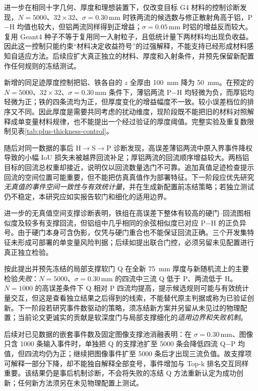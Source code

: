 \documentclass[UTF8,fontset=none,zihao=-4,a4paper]{ctexart}
\begin{document}
进一步在相同十字几何、厚度和理想装置下，仅改变目标 G4 材料的控制诊断发现，$N=5000$、$32\times32$、$\sigma=0.30\,\mathrm{mm}$ 时铁两流的候选数与修正散射角高于铝，P$-$H 均值也较大，但铝两流同样得到正增益；$\sigma=0.05\,\mathrm{mm}$ 时铝的增益反而较大。复用 Geant4 种子不等于复用同一入射粒子，且低统计量下两材料均出现负收益。因此这一控制只能约束“材料决定收益符号”的过强解释，不能支持已经形成材料感知自适应方法。后续应扩大真正独立的材料、厚度和入射条件，并预先保留新配置作任何规则的冻结测试。

新增的同足迹厚度控制把铝、铁各自的 $z$ 全厚由 \SI{100}{mm} 降为 \SI{50}{mm}。在预定的 $N=5000$、$32\times32$、$\sigma=0.30\,\mathrm{mm}$ 条件下，薄铝两流 P$-$H 均轻微为负，而厚铝均轻微为正；铁的四条流均为正，但厚度变化的增益幅度不一致。较小误差档位的排序又不同。因此厚度是需要共同考虑的扰动维度，现阶段既不能把旧的材料对照解释成单变量材料规律，也不能提出一个经过验证的厚度阈值。完整实验及重复数限制见表\ref{tab:plus-thickness-control}。

随后对同一数据的事后 H$\to$S$\to$P 诊断发现，高误差薄铝两流中原入界事件降权导致的小幅 IoU 损失未被越界回流补足；厚铝两流的回流顺序增益较大。两档铝目标的回流总权重却接近，说明仅以回流数量选门不可靠。追加真值足迹检查提示回流的空间位置可能重要，但不能把仿真真值作为部署特征。下一阶段应优先研究\emph{无真值的事件空间一致性与有效统计量}，并在生成新配置前冻结策略；若独立测试仍不稳定，本研究应如实报告软门和细化的适用边界。

进一步的无真值空间支撑诊断表明，铁组在高误差下整体有较高的硬门--回流图相似度及较多有支撑回流，但铝组中几乎相同的余弦相似度已对应 P$-$H 的正负异号。由于硬门本身可含伪影，仅凭与硬门重合也不能保证回流正确。三个开发集特征未形成可部署的单变量风险判据；后续如提出联合门控，必须另留未见配置进行真正独立检验。

按此提出并预先冻结的局部支撑软门 Q 在全新 \SI{75}{mm} 厚度与新随机流上的主要检验\emph{失败}：$N=5000$、$\sigma=0.30\,\mathrm{mm}$ 的四流中三流 Q 低于 P、两流低于 H。$N=1000$ 的高误差条件下 Q 相对 P 四流均提高，提示候选规则可能与有效统计量交互，但这是查看独立结果之后得到的线索，不能替代原主判据或称为已验证创新。下一阶段若研究事件数驱动的策略，须冻结新方案并另留从未见过的物理配置；当前论文更诚实的贡献是软深度门与局部支撑细化的\emph{适用边界和失败机制}。

后续对已见数据的嵌套事件数及固定图像支撑池消融表明：在 $\sigma=0.30\,\mathrm{mm}$、图像只含 1000 条输入事件时，单独把 Q 的支撑池扩至 5000 条会降低四流 Q$-$P 均值，但四流均仍为正；继续把图像事件扩至 5000 条后才出现三流负值。故支撑项可解释一部分下降，却不能独自解释全部变号，事件增加与 Top-k 排名交互同样重要。该结果仍是事后机制诊断，不会将失败的冻结 Q 方法重新认定为成功创新；任何新方法须另在未见物理配置上测试。
\end{document}
